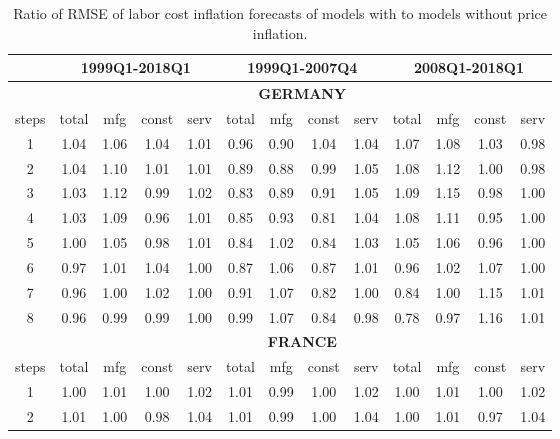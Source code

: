\documentclass[11pt]{article}
\begin{document}
\begin{appendices}
\begin{table}[htbp]
\small
\centering
  \caption{Ratio of RMSE of labor cost inflation forecasts of models with to models without price inflation.}
    \begin{tabular}{c|cccc|cccc|cccc}
     \midrule
    \multicolumn{1}{r}{} & \multicolumn{4}{c}{\textbf{1999Q1-2018Q1}} & \multicolumn{4}{c}{\textbf{1999Q1-2007Q4}} & \multicolumn{4}{c}{\textbf{2008Q1-2018Q1}} \\
    \midrule
    \multicolumn{1}{c}{} & \multicolumn{12}{c}{\textbf{GERMANY}} \\
    \midrule
    steps & total & mfg   & const & serv  & total & mfg   & const & serv  & total & mfg   & const & serv \\
    \midrule
    1     & 1.04  & 1.06  & 1.04  & 1.01  & 0.96  & 0.90  & 1.04  & 1.04  & 1.07  & 1.08  & 1.03  & 0.98 \\
    2     & 1.04  & 1.10  & 1.01  & 1.01  & 0.89  & 0.88  & 0.99  & 1.05  & 1.08  & 1.12  & 1.00  & 0.98 \\
    3     & 1.03  & 1.12  & 0.99  & 1.02  & 0.83  & 0.89  & 0.91  & 1.05  & 1.09  & 1.15  & 0.98  & 1.00 \\
    4     & 1.03  & 1.09  & 0.96  & 1.01  & 0.85  & 0.93  & 0.81  & 1.04  & 1.08  & 1.11  & 0.95  & 1.00 \\
    5     & 1.00  & 1.05  & 0.98  & 1.01  & 0.84  & 1.02  & 0.84  & 1.03  & 1.05  & 1.06  & 0.96  & 1.00 \\
    6     & 0.97  & 1.01  & 1.04  & 1.00  & 0.87  & 1.06  & 0.87  & 1.01  & 0.96  & 1.02  & 1.07  & 1.00 \\
    7     & 0.96  & 1.00  & 1.02  & 1.00  & 0.91  & 1.07  & 0.82  & 1.00  & 0.84  & 1.00  & 1.15  & 1.01 \\
    8     & 0.96  & 0.99  & 0.99  & 1.00  & 0.99  & 1.07  & 0.84  & 0.98  & 0.78  & 0.97  & 1.16  & 1.01 \\
    \midrule
    \multicolumn{1}{c}{} & \multicolumn{12}{c}{\textbf{FRANCE}} \\
    \midrule
    steps & total & mfg   & const & serv  & total & mfg   & const & serv  & total & mfg   & const & serv \\
    \midrule
    1     & 1.00  & 1.01  & 1.00  & 1.02  & 1.01  & 0.99  & 1.00  & 1.02  & 1.00  & 1.01  & 1.00  & 1.02 \\
    2     & 1.01  & 1.00  & 0.98  & 1.04  & 1.01  & 0.99  & 1.00  & 1.04  & 1.00  & 1.01  & 0.97  & 1.04 \\

\end{tabular}
\end{table}
\end{appendices}
\end{document}
